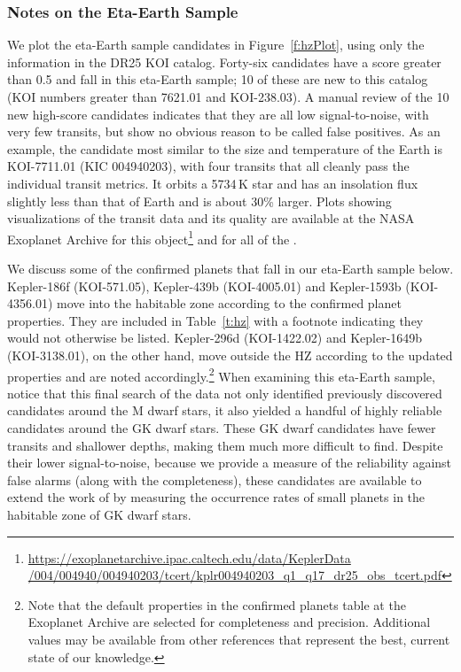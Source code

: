 \subsubsection{Notes on the Eta-Earth Sample}
We plot the eta-Earth sample candidates in Figure~\ref{f:hzPlot}, using only the information in the DR25 KOI catalog.  Forty-six candidates have a score greater than 0.5 and fall in this eta-Earth sample; 10 of these are new to this catalog (KOI numbers greater than 7621.01 and KOI-238.03).  A manual review of the 10 new high-score candidates indicates that they are all low signal-to-noise, with very few transits, but show no obvious reason to be called false positives. As an example, the candidate most similar to the size and temperature of the Earth is KOI-7711.01 (KIC 004940203), with four transits that all cleanly pass the individual transit metrics. It orbits a 5734\,K star and has an insolation flux slightly less than that of Earth and is about 30\% larger.  Plots showing visualizations of the transit data and its quality are available at the NASA Exoplanet Archive for this object\footnote{\url{https://exoplanetarchive.ipac.caltech.edu/data/KeplerData /004/004940/004940203/tcert/kplr004940203\_q1\_q17\_dr25\_obs\_tcert.pdf}} and for all of the .

We discuss some of the confirmed planets that fall in our eta-Earth sample below.  Kepler-186f (KOI-571.05), Kepler-439b (KOI-4005.01) and Kepler-1593b (KOI-4356.01) move into the habitable zone according to the confirmed planet properties. They are included in Table~\ref{t:hz} with a footnote indicating they would not otherwise be listed. Kepler-296d (KOI-1422.02) and Kepler-1649b (KOI-3138.01), on the other hand, move outside the HZ according to the updated properties and are noted accordingly.\footnote{Note that the default properties in the confirmed planets table at the Exoplanet Archive are selected for completeness and precision. Additional values may be available from other references that represent the best, current state of our knowledge.} 
{\color{blue}
When examining this eta-Earth sample, notice that this final search of the \Kepler{} data not only identified previously discovered candidates around the M dwarf stars, it also yielded a handful of highly reliable candidates around the GK dwarf stars. These GK dwarf candidates have fewer transits and shallower depths, making them much more difficult to find.  Despite their lower signal-to-noise, because we provide a measure of the reliability against false alarms (along with the completeness), these candidates are available to extend the work of  \citet{Burke2016,Dressing2015,Petigura2013b} by measuring the occurrence rates of small planets in the habitable zone of GK dwarf stars.
}

